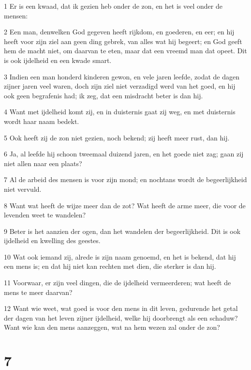 \par 1 Er is een kwaad, dat ik gezien heb onder de zon, en het is veel onder de mensen:
\par 2 Een man, denwelken God gegeven heeft rijkdom, en goederen, en eer; en hij heeft voor zijn ziel aan geen ding gebrek, van alles wat hij begeert; en God geeft hem de macht niet, om daarvan te eten, maar dat een vreemd man dat opeet. Dit is ook ijdelheid en een kwade smart.
\par 3 Indien een man honderd kinderen gewon, en vele jaren leefde, zodat de dagen zijner jaren veel waren, doch zijn ziel niet verzadigd werd van het goed, en hij ook geen begrafenis had; ik zeg, dat een misdracht beter is dan hij.
\par 4 Want met ijdelheid komt zij, en in duisternis gaat zij weg, en met duisternis wordt haar naam bedekt.
\par 5 Ook heeft zij de zon niet gezien, noch bekend; zij heeft meer rust, dan hij.
\par 6 Ja, al leefde hij schoon tweemaal duizend jaren, en het goede niet zag; gaan zij niet allen naar een plaats?
\par 7 Al de arbeid des mensen is voor zijn mond; en nochtans wordt de begeerlijkheid niet vervuld.
\par 8 Want wat heeft de wijze meer dan de zot? Wat heeft de arme meer, die voor de levenden weet te wandelen?
\par 9 Beter is het aanzien der ogen, dan het wandelen der begeerlijkheid. Dit is ook ijdelheid en kwelling des geestes.
\par 10 Wat ook iemand zij, alrede is zijn naam genoemd, en het is bekend, dat hij een mens is; en dat hij niet kan rechten met dien, die sterker is dan hij.
\par 11 Voorwaar, er zijn veel dingen, die de ijdelheid vermeerderen; wat heeft de mens te meer daarvan?
\par 12 Want wie weet, wat goed is voor den mens in dit leven, gedurende het getal der dagen van het leven zijner ijdelheid, welke hij doorbrengt als een schaduw? Want wie kan den mens aanzeggen, wat na hem wezen zal onder de zon?

\chapter{7}


